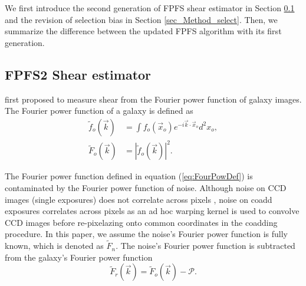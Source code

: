 We first introduce the second generation of FPFS shear estimator in Section
\ref{sec_Method_shapelets} and the revision of selection bias in Section
\ref{sec_Method_select}. Then, we summarize the difference between the updated
FPFS algorithm with its first generation.

\subsection{FPFS2 Shear estimator}
\label{sec_Method_shapelets}

\citet{Z08} first proposed to measure shear from the Fourier power function of
galaxy images. The Fourier power function of a galaxy is defined as
\begin{equation} \label{eq:FourPowDef}
\begin{split}
\tilde{f}_o(\vec{k})&=\int f_o(\vec{x}_o) e^{-i\vec{k} \cdot \vec{x}_o} d^2x_o,\\
\tilde{F}_o(\vec{k})&=|\tilde{f}_o(\vec{k})|^2.
\end{split}
\end{equation}

The Fourier power function defined in equation (\ref{eq:FourPowDef}) is
contaminated by the Fourier power function of noise. Although noise on CCD
images (single exposures) does not correlate across pixels \citep{Z15}, noise
on coadd exposures correlates across pixels as an ad hoc warping kernel is used
to convolve CCD images before re-pixelazing onto common coordinates in the
coadding procedure. In this paper, we assume the noise's Fourier power function
is fully known, which is denoted as $\tilde{F}_n$. The noise's Fourier power
function is subtracted from the galaxy's Fourier power function
\begin{equation}
    \tilde{F}_r(\vec{k})=\tilde{F}_o(\vec{k})-\mathcal{P}.
\end{equation}

